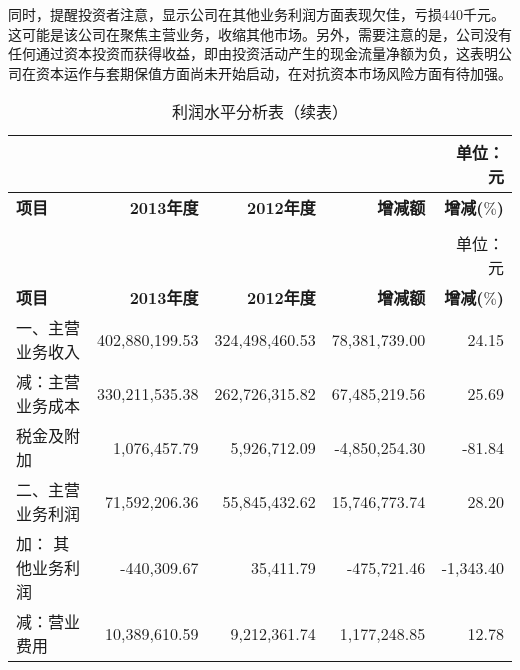 同时，提醒投资者注意，显示公司在其他业务利润方面表现欠佳，亏损440千元。这可能是该公司在聚焦主营业务，收缩其他市场。另外，需要注意的是，公司没有任何通过资本投资而获得收益，即由投资活动产生的现金流量净额为负，这表明公司在资本运作与套期保值方面尚未开始启动，在对抗资本市场风险方面有待加强。
\renewcommand*{\arraystretch}{0.8}
\setlength{\tabcolsep}{8pt}
\begin{longtable}{>{\footnotesize}l>{\footnotesize}r>{\footnotesize}r>{\footnotesize}r>{\footnotesize}r}
\caption[利润水平分析表]{利润水平分析表}\\  %
&&&& {\scriptsize 单位：元}\\
\hline\hline
\rowcolor{mycyan}	\hspace{3em} \bfseries 项目 	& \bfseries 2013年度\hspace{1em} & \bfseries 2012年度\hspace{1em} &  \bfseries 增减额\hspace{1.5em}      & \hspace{1em} \bfseries 增减($\%$)  \\ \endfirsthead          %
\caption[]{利润水平分析表（续表）} \\ 
&&&& {\scriptsize 单位：元}\\                        %
\hline\hline
\rowcolor{mycyan}	\hspace{3em} \bfseries 项目 	& \bfseries 2013年度\hspace{1em} & \bfseries 2012年度\hspace{1em} &  \bfseries 增减额\hspace{1.5em}      & \hspace{1em} \bfseries 增减($\%$)  \\  \endhead                %
\hline
\endfoot
\hline   %
一、主营业务收入 & 402,880,199.53 & 324,498,460.53 & 78,381,739.00 & 24.15\\
       \quad 减：主营业务成本 & 330,211,535.38 & 262,726,315.82 & 67,485,219.56 & 25.69\\
              \qquad\quad 税金及附加 & 1,076,457.79 & 5,926,712.09 & -4,850,254.30 & -81.84\\
二、主营业务利润 & 71,592,206.36 & 55,845,432.62 & 15,746,773.74 & 28.20\\
        \quad 加： 其他业务利润 & -440,309.67 & 35,411.79 & -475,721.46 & -1,343.40\hspace{2ex}\\
        \quad 减：营业费用 & 10,389,610.59 & 9,212,361.74 & 1,177,248.85 & 12.78\\

\end{longtable}
